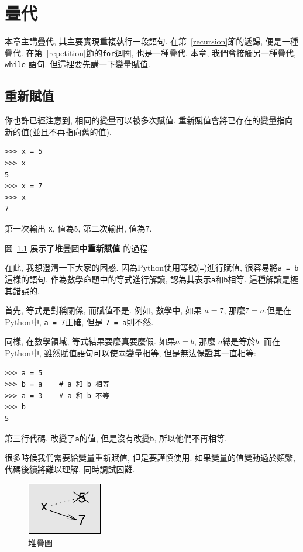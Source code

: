 \documentclass[10pt]{book}
\begin{document}
\chapter{疊代}

本章主講疊代, 其主要實現重複執行一段語句. 
在第~\ref{recursion}節的遞歸, 便是一種疊代. 
在第~\ref{repetition}節的{\tt for}迴圈, 也是一種疊代. 
本章, 我們會接觸另一種疊代, {\tt while} 語句. 
但這裡要先講一下變量賦值. 

\section{重新賦值}

你也許已經注意到, 相同的變量可以被多次賦值. 
重新賦值會將已存在的變量指向新的值(並且不再指向舊的值).

\begin{verbatim}
>>> x = 5
>>> x
5
>>> x = 7
>>> x
7
\end{verbatim}
%
第一次輸出{ \tt x}, 值為5, 第二次輸出, 值為7.

圖~\ref{fig.assign2}  展示了堆疊圖中{\bf 重新賦值}
的過程.  

在此, 我想澄清一下大家的困惑.
因為Python使用等號({\tt =})進行賦值, 
很容易將{\tt a = b}這樣的語句, 作為數學命題中的等式進行解讀, 
認為其表示{\tt a}和{\tt b}相等. 
這種解讀是極其錯誤的. 

首先, 等式是對稱關係, 而賦值不是. 
例如, 數學中, 如果 $a=7$, 那麼$7=a$.但是在Python中, 
{\tt a = 7}正確, 但是 {\tt 7 = a}則不然. 

同樣, 在數學領域, 等式結果要麼真要麼假. 
如果$a=b$, 那麼 $a$總是等於$b$. 
而在Python中, 雖然賦值語句可以使兩變量相等, 但是無法保證其一直相等:

\begin{verbatim}
>>> a = 5
>>> b = a    # a 和 b 相等
>>> a = 3    # a 和 b 不等
>>> b
5
\end{verbatim}
%
第三行代碼, 改變了{\tt a}的值, 但是沒有改變{\tt b}, 所以他們不再相等. 

很多時候我們需要給變量重新賦值, 但是要謹慎使用. 
如果變量的值變動過於頻繁, 代碼後續將難以理解, 同時調試困難. 

\begin{figure}
\centerline
{\includegraphics[scale=0.8]{figs/assign2.pdf}}
\caption{堆疊圖}
\label{fig.assign2}
\end{figure}
\end{document}
